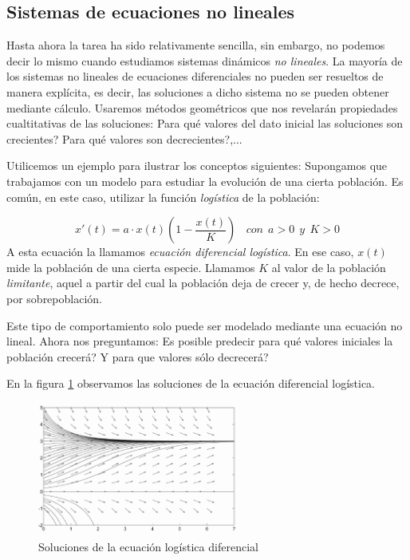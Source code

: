 \subsection{Sistemas de ecuaciones no lineales}
Hasta ahora la tarea ha sido relativamente sencilla, sin embargo, no podemos decir lo mismo cuando estudiamos sistemas dinámicos \emph{no lineales}. La mayoría de los sistemas no lineales de ecuaciones diferenciales no pueden ser resueltos de manera explícita, es decir, las soluciones a dicho sistema no se pueden obtener mediante cálculo. Usaremos métodos geométricos que nos revelarán propiedades cualtitativas de las soluciones: Para qué valores del dato inicial las soluciones son crecientes? Para qué valores son decrecientes?,...

Utilicemos un ejemplo para ilustrar los conceptos siguientes: Supongamos que trabajamos con un modelo para estudiar la evolución de una cierta población. Es común, en este caso, utilizar la función \emph{logística} de la población:

\begin{equation}
x'(t) = a\cdot x(t)(1-\frac{x(t)}{K})~~~~con~~a>0~~y~~K>0
\end{equation}
A esta ecuación la llamamos \emph{ecuación diferencial logística}. En ese caso, $x(t)$ mide la población de una cierta especie. Llamamos $K$ al valor de la población \emph{limitante}, aquel a partir del cual la población deja de crecer y, de hecho decrece, por sobrepoblación.

Este tipo de comportamiento solo puede ser modelado mediante una ecuación no lineal. Ahora nos preguntamos: Es posible predecir para qué valores iniciales la población crecerá? Y para que valores sólo decrecerá?

En la figura \ref{fig:poblacion} observamos las soluciones de la ecuación diferencial logística.

\begin{figure}[hbtp]
\centering
\includegraphics[width = 0.6\textwidth]{img/poblacion.png}
\caption{Soluciones de la ecuación logística diferencial}
\label{fig:poblacion}
\end{figure}


